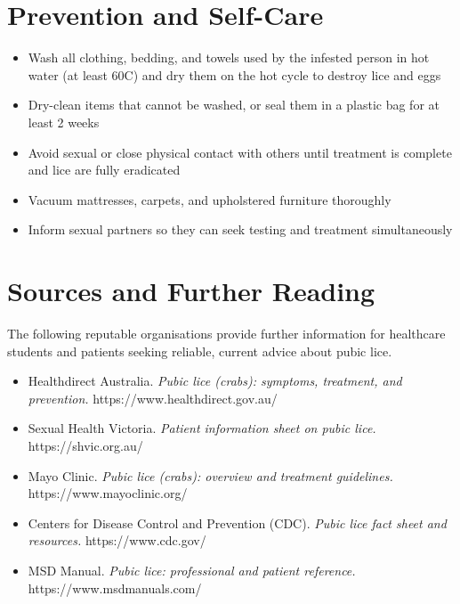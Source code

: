 \section*{Prevention and Self-Care}
\begin{itemize}
    \item Wash all clothing, bedding, and towels used by the infested person in hot water (at least 60\textdegree{}C) and dry them on the hot cycle to destroy lice and eggs
    \item Dry-clean items that cannot be washed, or seal them in a plastic bag for at least 2 weeks
    \item Avoid sexual or close physical contact with others until treatment is complete and lice are fully eradicated
    \item Vacuum mattresses, carpets, and upholstered furniture thoroughly
    \item Inform sexual partners so they can seek testing and treatment simultaneously
\end{itemize}

\section*{Sources and Further Reading}
The following reputable organisations provide further information for healthcare students and patients seeking reliable, current advice about pubic lice.

\begin{itemize}
    \item Healthdirect Australia. \textit{Pubic lice (crabs): symptoms, treatment, and prevention.} https://www.healthdirect.gov.au/
    \item Sexual Health Victoria. \textit{Patient information sheet on pubic lice.} https://shvic.org.au/
    \item Mayo Clinic. \textit{Pubic lice (crabs): overview and treatment guidelines.} https://www.mayoclinic.org/
    \item Centers for Disease Control and Prevention (CDC). \textit{Pubic lice fact sheet and resources.} https://www.cdc.gov/
    \item MSD Manual. \textit{Pubic lice: professional and patient reference.} https://www.msdmanuals.com/
\end{itemize}
